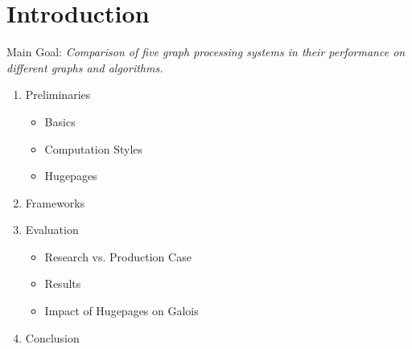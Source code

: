 \documentclass{meetings}
\author{S. König, L. Matzner, F. Rollbühler and J. Schmid}
\date{Tuesday, 20\textsuperscript{th} October 2020}
\begin{document}
\section{Introduction}
\begin{center}
	\begin{minipage}{0.6\linewidth}
		\centering
		Main Goal: \itshape  Comparison of five graph processing systems in their performance on different graphs and algorithms.
	\end{minipage}
\end{center}



\begin{enumerate}
	\item Preliminaries
	\begin{itemize}
	\item Basics
	\item Computation Styles
	\item Hugepages
	\end{itemize}
	\item Frameworks
	\item Evaluation
	\begin{itemize}
	\item Research vs. Production Case
	\item Results
	\item Impact of Hugepages on Galois
	\end{itemize}
	\item Conclusion
\end{enumerate}






\clearpage
\end{document}
